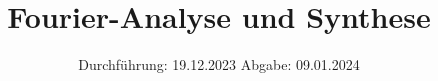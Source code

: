 

\subject{V351}
\title{Fourier-Analyse und Synthese}
\date{%
  Durchführung: 19.12.2023
  \hspace{3em}
  Abgabe: 09.01.2024
}



\maketitle
\thispagestyle{empty}
\tableofcontents
\newpage






\printbibliography{}
\appendix
\setcounter{secnumdepth}{0}

